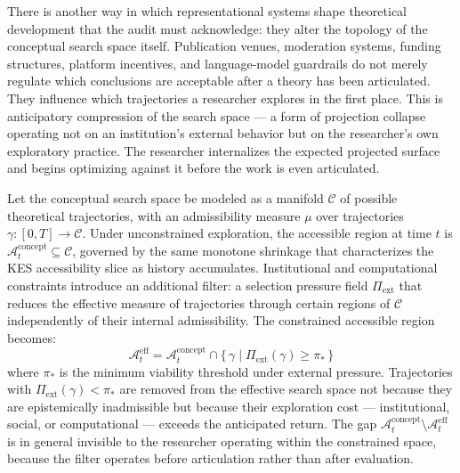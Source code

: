 \documentclass[12pt, a4paper]{article}
\begin{document}
There is another way in which representational systems shape theoretical development that the audit must acknowledge: they alter the topology of the conceptual search space itself. Publication venues, moderation systems, funding structures, platform incentives, and language-model guardrails do not merely regulate which conclusions are acceptable after a theory has been articulated. They influence which trajectories a researcher explores in the first place. This is anticipatory compression of the search space --- a form of projection collapse operating not on an institution's external behavior but on the researcher's own exploratory practice. The researcher internalizes the expected projected surface and begins optimizing against it before the work is even articulated.

Let the conceptual search space be modeled as a manifold $\mathcal{C}$ of possible theoretical trajectories, with an admissibility measure $\mu$ over trajectories $\gamma \colon [0,T] \to \mathcal{C}$. Under unconstrained exploration, the accessible region at time $t$ is $\mathcal{A}_t^{\mathrm{concept}} \subseteq \mathcal{C}$, governed by the same monotone shrinkage that characterizes the KES accessibility slice as history accumulates. Institutional and computational constraints introduce an additional filter: a selection pressure field $\Pi_{\mathrm{ext}}$ that reduces the effective measure of trajectories through certain regions of $\mathcal{C}$ independently of their internal admissibility. The constrained accessible region becomes:
\[
\mathcal{A}_t^{\mathrm{eff}}
= \mathcal{A}_t^{\mathrm{concept}}
\cap \bigl\{\,\gamma \;\big|\; \Pi_{\mathrm{ext}}(\gamma) \geq \pi_*\,\bigr\}
\]
where $\pi_*$ is the minimum viability threshold under external pressure. Trajectories with $\Pi_{\mathrm{ext}}(\gamma) < \pi_*$ are removed from the effective search space not because they are epistemically inadmissible but because their exploration cost --- institutional, social, or computational --- exceeds the anticipated return. The gap $\mathcal{A}_t^{\mathrm{concept}} \setminus \mathcal{A}_t^{\mathrm{eff}}$ is in general invisible to the researcher operating within the constrained space, because the filter operates before articulation rather than after evaluation.
\end{document}
